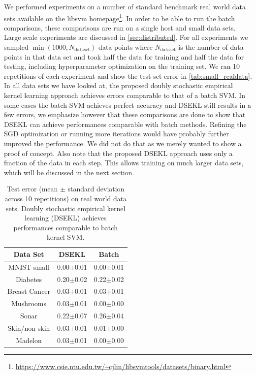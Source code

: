 \documentclass{article} %
\begin{document}
%
We performed experiments on a number of standard benchmark real world data sets available on the libsvm homepage\footnote{\url{https://www.csie.ntu.edu.tw/~cjlin/libsvmtools/datasets/binary.html}}. In order to be able to run the batch comparisons, these comparisons are run on a single host and small data sets. Large scale experiments are discussed in \autoref{sec:distributed}. For all experiments we sampled $\min(1000,N_{\text{dataset}})$ data points where $N_{\text{dataset}}$ is the number of data points in that data set and took half the data for training and half the data for testing, including hyperparameter optimization on the training set. We ran 10 repetitions of each experiment and show the test set error in \autoref{tab:small_realdata}. In all data sets we have looked at, the proposed doubly stochastic empirical kernel learning approach achieves errors comparable to that of a batch SVM. In some cases the batch SVM achieves perfect accuracy and DSEKL still results in a few errors, we emphasize however that these comparisons are done to show that DSEKL can achieve performances comparable with batch methods. Refining the SGD optimization or running more iterations would have probably further improved the performance. We did not do that as we merely wanted to show a proof of concept. Also note that the proposed DSEKL approach uses only a fraction of the data in each step. This allows training on much larger data sets, which will be discussed in the next section.
%
\begin{table}
\begin{center}
\begin{tabular}{ ccc } 
Data Set & DSEKL & Batch\\
 \hline
MNIST small & 0.00$\pm$0.01  & 0.00$\pm$0.01\\
Diabetes & 0.20$\pm$0.02  & 0.22$\pm$0.02\\
Breast Cancer &  0.03$\pm$0.01 & 0.03$\pm$0.01\\
Mushrooms & 0.03$\pm$0.01 & 0.00$\pm$0.00\\
Sonar & 0.22$\pm$0.07 & 0.26$\pm$0.04\\
Skin/non-skin & 0.03$\pm$0.01 &  0.01$\pm$0.00\\
Madelon & 0.03$\pm$0.01 &  0.00$\pm$0.00\\
 \hline
\end{tabular}
\caption{Test error (mean $\pm$ standard deviation across 10 repetitions) on real world data sets. Doubly stochastic empirical kernel learning (DSEKL) achieves performances comparable to batch kernel SVM. \label{tab:small_realdata}}
\end{center}
\end{table}
%
\end{document}
